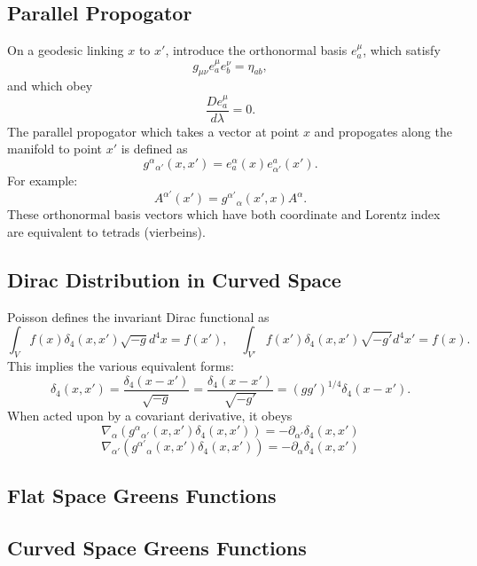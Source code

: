 \documentclass[10pt,letterpaper]{article}
\begin{document}
\subsection{Parallel Propogator}
On a geodesic linking $x$ to $x'$, introduce the orthonormal basis $e^\mu_a$, which satisfy
\begin{equation}
g_{\mu\nu}e^\mu_ae^\nu_b = \eta_{ab},
\end{equation}
and which obey
\begin{equation}
\frac{D e^\mu_a}{d\lambda} = 0.
\end{equation}
The parallel propogator which takes a vector at point $x$ and propogates along the manifold to point $x'$ is defined as
\begin{equation}
g^\alpha{}_{\alpha'}(x,x') = e^\alpha_a(x)e^a_{\alpha'}(x').
\end{equation}
For example:
\begin{equation}
A^{\alpha'}(x') = g^{\alpha'}{}_\alpha (x',x)A^{\alpha}.
\end{equation}
These orthonormal basis vectors which have both coordinate and Lorentz index are equivalent to tetrads (vierbeins). 
\subsection{Dirac Distribution in Curved Space}
Poisson defines the invariant Dirac functional as
\begin{equation}
\int_V f(x)\delta_4(x,x')\sqrt{-g}d^4x = f(x'),\quad \int_{V'} f(x')\delta_4(x,x')\sqrt{-g'}d^4x' = f(x).
\end{equation}
This implies the various equivalent forms:
\begin{equation}
\delta_4(x,x') = \frac{\delta_4(x-x')}{\sqrt{-g}}=\frac{\delta_4(x-x')}{\sqrt{-g'}}
=(gg')^{1/4} \delta_4(x-x').
\end{equation}
When acted upon by a covariant derivative, it obeys
\begin{equation}
\nabla_\alpha(g^\alpha{}_{\alpha'}(x,x')\delta_4(x,x')) = -\partial_{\alpha'} \delta_4(x,x')
\end{equation}
\begin{equation}
\nabla_{\alpha'}(g^{\alpha'}{}_{\alpha}(x,x')\delta_4(x,x')) = -\partial_{\alpha} \delta_4(x,x')
\end{equation}
\subsection{Flat Space Greens Functions}
\subsection{Curved Space Greens Functions}
\end{document}
